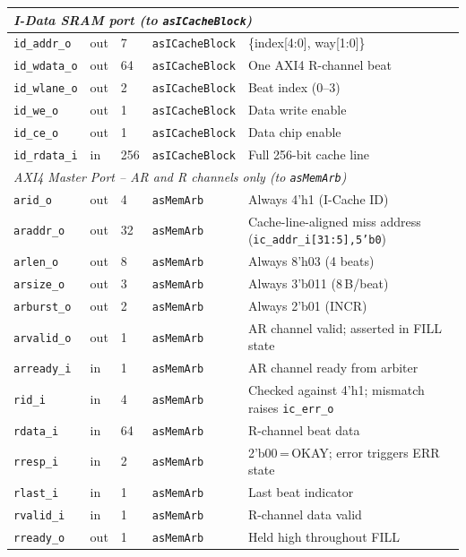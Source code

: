 \begin{table}[H]
\begin{tabularx}{\textwidth}{|l |l |l |l |X|}
  \hline
  \multicolumn{5}{|l|}{\textit{I-Data SRAM port (to \texttt{asICacheBlock})}} \\
  \hline
  \texttt{id\_addr\_o}  & out & 7  & \texttt{asICacheBlock} & \{index[4:0], way[1:0]\} \\
  \hline
  \texttt{id\_wdata\_o} & out & 64 & \texttt{asICacheBlock} & One AXI4 R-channel beat \\
  \hline
  \texttt{id\_wlane\_o} & out & 2  & \texttt{asICacheBlock} & Beat index (0--3) \\
  \hline
  \texttt{id\_we\_o}    & out & 1  & \texttt{asICacheBlock} & Data write enable \\
  \hline
  \texttt{id\_ce\_o}    & out & 1  & \texttt{asICacheBlock} & Data chip enable \\
  \hline
  \texttt{id\_rdata\_i} & in  & 256 & \texttt{asICacheBlock} & Full 256-bit cache line \\
  \hline
  \multicolumn{5}{|l|}{\textit{AXI4 Master Port -- AR and R channels only (to \texttt{asMemArb})}} \\
  \hline
  \texttt{arid\_o}    & out & 4  & \texttt{asMemArb} & Always 4'h1 (I-Cache ID) \\
  \hline
  \texttt{araddr\_o}  & out & 32 & \texttt{asMemArb} & Cache-line-aligned miss address (\texttt{ic\_addr\_i[31:5],5'b0}) \\
  \hline
  \texttt{arlen\_o}   & out & 8  & \texttt{asMemArb} & Always 8'h03 (4 beats) \\
  \hline
  \texttt{arsize\_o}  & out & 3  & \texttt{asMemArb} & Always 3'b011 (8\,B/beat) \\
  \hline
  \texttt{arburst\_o} & out & 2  & \texttt{asMemArb} & Always 2'b01 (INCR) \\
  \hline
  \texttt{arvalid\_o} & out & 1  & \texttt{asMemArb} & AR channel valid; asserted in FILL state \\
  \hline
  \texttt{arready\_i} & in  & 1  & \texttt{asMemArb} & AR channel ready from arbiter \\
  \hline
  \texttt{rid\_i}     & in  & 4  & \texttt{asMemArb} & Checked against 4'h1; mismatch raises \texttt{ic\_err\_o} \\
  \hline
  \texttt{rdata\_i}   & in  & 64 & \texttt{asMemArb} & R-channel beat data \\
  \hline
  \texttt{rresp\_i}   & in  & 2  & \texttt{asMemArb} & 2'b00\,=\,OKAY; error triggers ERR state \\
  \hline
  \texttt{rlast\_i}   & in  & 1  & \texttt{asMemArb} & Last beat indicator \\
  \hline
  \texttt{rvalid\_i}  & in  & 1  & \texttt{asMemArb} & R-channel data valid \\
  \hline
  \texttt{rready\_o}  & out & 1  & \texttt{asMemArb} & Held high throughout FILL \\
  \hline
\end{tabularx}
\end{table}

